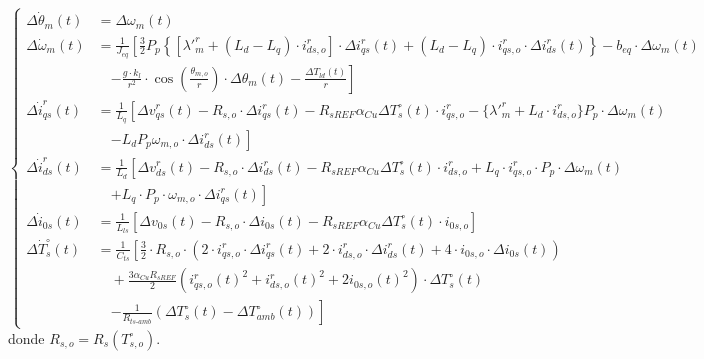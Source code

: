 \documentclass[12pt, a4paper,journal, onecolumn, compsoc]{IEEEtran}
\begin{document}
\begin{equation*}
\left\{
    \begin{aligned}
        \Delta \dot{\theta}_m(t) &= \Delta \omega_m(t) \\[10pt]
        \Delta \dot{\omega}_m(t) &= \frac{1}{J_{eq}} \left[ \frac{3}{2} P_p \left\{ [\lambda'^r_m + (L_d - L_q) \cdot i^r_{ds,o}] \cdot \Delta i_{qs}^r(t) + (L_d - L_q) \cdot i^r_{qs,o} \cdot \Delta i_{ds}^r(t) \right\} - b_{eq} \cdot \Delta \omega_m(t) \right. \\
        &\quad \left. - \frac{g \cdot k_l}{r^2} \cdot \cos\left(\frac{\theta_{m,o}}{r}\right) \cdot \Delta \theta_m(t) - \frac{\Delta T_{ld}(t)}{r} \right] \\[10pt]
        \Delta \dot{i}_{qs}^r(t) &= \frac{1}{L_q} \left[ \Delta v_{qs}^r(t) - R_{s,o} \cdot \Delta i_{qs}^r(t) - R_{sREF} \alpha_{Cu} \Delta T_s^\circ(t) \cdot i^r_{qs,o} - \{\lambda'^r_m + L_d \cdot i^r_{ds,o}\} P_p \cdot \Delta \omega_m(t) \right. \\
        &\quad \left. - L_d P_p \omega_{m,o} \cdot \Delta i_{ds}^r(t) \right] \\[10pt]
        \Delta \dot{i}_{ds}^r(t) &= \frac{1}{L_d} \left[ \Delta v_{ds}^r(t) - R_{s,o} \cdot \Delta i_{ds}^r(t) - R_{sREF} \alpha_{Cu} \Delta T_s^\circ(t) \cdot i^r_{ds,o} + L_q \cdot i^r_{qs,o} \cdot P_p \cdot \Delta \omega_m(t) \right. \\
        &\quad \left. + L_q \cdot P_p \cdot \omega_{m,o} \cdot \Delta i_{qs}^r(t) \right] \\[10pt]
        \Delta \dot{i}_{0s}(t) &= \frac{1}{L_{ls}} \left[ \Delta v_{0s}(t) - R_{s,o} \cdot \Delta i_{0s}(t) - R_{sREF} \alpha_{Cu} \Delta T_s^\circ(t) \cdot i_{0s,o} \right] \\[10pt]
        \Delta \dot{T}_s^\circ(t) &= \frac{1}{C_{ts}} \left[ \frac{3}{2} \cdot R_{s,o} \cdot (2 \cdot i^r_{qs,o} \cdot \Delta i_{qs}^r(t) + 2 \cdot i^r_{ds,o} \cdot \Delta i_{ds}^r(t) + 4 \cdot i_{0s,o} \cdot \Delta i_{0s}(t)) \right. \\
        &\quad + \frac{3 \alpha_{Cu} R_{sREF}}{2} (i^r_{qs,o}(t)^2 + i^r_{ds,o}(t)^2 + 2i_{0s,o}(t)^2) \cdot \Delta T_s^\circ(t) \\
        &\quad \left. - \frac{1}{R_{ts\text{-}amb}} (\Delta T_s^\circ(t) - \Delta T_{amb}^\circ(t)) \right]
    \end{aligned}
\right.
\end{equation*}
donde \(R_{s,o}=R_s(T_{s,o}^\circ)\).
\end{document}
